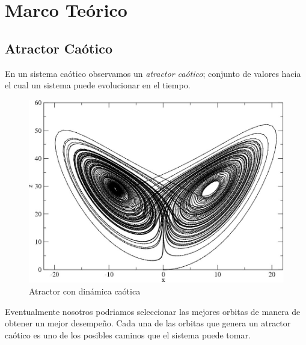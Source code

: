 \documentclass[DIV=calc, paper=a4, fontsize=11pt, twocolumn]{scrartcl}	 %
\begin{document}
\section*{Marco Teórico}
\subsection*{Atractor Caótico}
En un sistema caótico observamos un \emph{atractor caótico}; conjunto de valores hacia el cual un sistema puede evolucionar en el tiempo.
\begin{figure}[htp]
\centering
\includegraphics[scale=0.2]{lorenzatractor.jpg}
\caption{Atractor con dinámica caótica}
\label{atractor de lorenz}
\end{figure}
Eventualmente nosotros podriamos seleccionar las mejores orbitas de manera de obtener un mejor desempeño. Cada una de las orbitas que genera un atractor caótico es uno de los posibles caminos que el sistema puede tomar.
\end{document}

